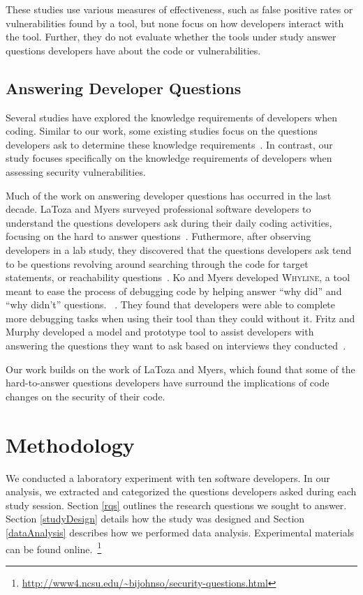 \documentclass{acm_proc_article-sp}
\newcommand{\blind}[1]{#1}
\begin{document}
These studies use various measures of effectiveness, such as false positive rates or vulnerabilities found by a tool, but none focus on how developers interact with the tool. 
Further, they do not evaluate whether the tools under study answer questions developers have about the code or vulnerabilities. 

\subsection{Answering Developer Questions}
\label{questions}
Several studies have explored the knowledge requirements of developers when coding.
Similar to our work, some existing studies focus on the questions developers ask to determine these knowledge requirements~\cite{latoza2010hard, latoza2010developers}.
In contrast, our study focuses specifically on the knowledge requirements of developers when assessing security vulnerabilities.


Much of the work on answering developer questions has occurred in the last decade. 
LaToza and Myers surveyed professional software developers to understand the questions developers ask during their daily coding activities, focusing on the hard to answer questions~\cite{latoza2010hard}. 
Futhermore, after observing developers in a lab study, they discovered that the questions developers ask tend to be questions revolving around searching through the code for target statements, or reachability questions~\cite{latoza2010developers}. 
Ko and Myers developed \textsc{Whyline}, a tool meant to ease the process of debugging code by helping answer ``why did'' and ``why didn't'' questions. ~\cite{ko2004designing}. 
They found that developers were able to complete more debugging tasks when using their tool than they could without it.
Fritz and Murphy developed a model and prototype tool to assist developers with answering the questions they want to ask based on interviews they conducted~\cite{fritz2010using}.

Our work builds on the work of LaToza and Myers, which found that some of the hard-to-answer questions developers have surround the implications of code changes on the security of their code. 

\section{Methodology}
\label{sec:meth}
We conducted a laboratory experiment with ten software developers. In our analysis, we extracted and categorized the questions developers asked during each study session. 
Section \ref{rqs} outlines the research questions we sought to answer. 
Section \ref{studyDesign} details how the study was designed and Section \ref{dataAnalysis} describes how we performed data analysis.
Experimental materials can be found online.~\footnote{\blind{\url{http://www4.ncsu.edu/~bijohnso/security-questions.html}}}
\end{document}

